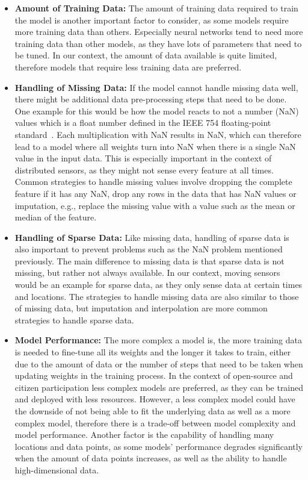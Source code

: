 \begin{itemize}
    \item \textbf{Amount of Training Data:} The amount of training data required to train the model is another important factor to consider, as some models require more training data than others. Especially neural networks tend to need more training data than other models, as they have lots of parameters that need to be tuned. In our context, the amount of data available is quite limited, therefore models that require less training data are preferred.
    \item \textbf{Handling of Missing Data:} If the model cannot handle missing data well, there might be additional data pre-processing steps that need to be done. One example for this would be how the model reacts to not a number (NaN) values which is a float number defined in the IEEE 754 floating-point standard~\cite{ieee754}. Each multiplication with NaN results in NaN, which can therefore lead to a model where all weights turn into NaN when there is a single NaN value in the input data. This is especially important in the context of distributed sensors, as they might not sense every feature at all times. Common strategies to handle missing values involve dropping the complete feature if it has any NaN, drop any rows in the data that has NaN values or imputation, e.g., replace the missing value with a value such as the mean or median of the feature.
    \item \textbf{Handling of Sparse Data:} Like missing data, handling of sparse data is also important to prevent problems such as the NaN problem mentioned previously. The main difference to missing data is that sparse data is not missing, but rather not always available. In our context, moving sensors would be an example for sparse data, as they only sense data at certain times and locations. The strategies to handle missing data are also similar to those of missing data, but imputation and interpolation are more common strategies to handle sparse data.
    \item \textbf{Model Performance:} The more complex a model is, the more training data is needed to fine-tune all its weights and the longer it takes to train, either due to the amount of data or the number of steps that need to be taken when updating weights in the training process. In the context of open-source and citizen participation less complex models are preferred, as they can be trained and deployed with less resources. However, a less complex model could have the downside of not being able to fit the underlying data as well as a more complex model, therefore there is a trade-off between model complexity and model performance. Another factor is the capability of handling many locations and data points, as some models' performance degrades significantly when the amount of data points increases, as well as the ability to handle high-dimensional data.

\end{itemize}
